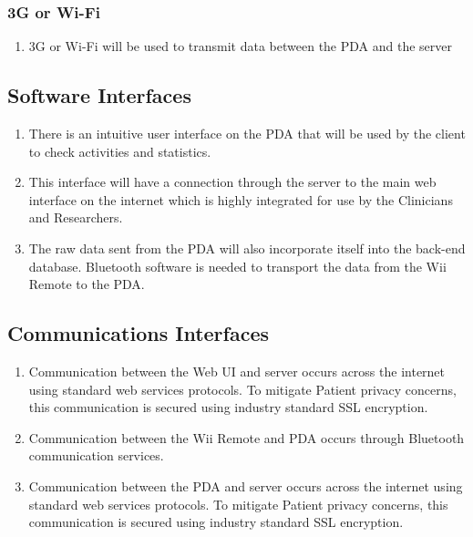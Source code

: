 \documentclass{article}
\begin{document}
\subsubsection{3G or Wi-Fi}
\begin{enumerate}
\item 3G or Wi-Fi will be used to transmit data between the PDA and the server
\end{enumerate}

\subsection{Software Interfaces}

\begin{enumerate}
\item There is an intuitive user interface on the PDA that will be used by the client to check activities and statistics.
\item This interface will have a connection through the server to the main web interface on the internet which is highly integrated for use by the Clinicians and Researchers.
\item The raw data sent from the PDA will also incorporate itself into the back-end database.  Bluetooth software is needed to transport the data from the Wii Remote to the PDA.
\end{enumerate}

\subsection{Communications Interfaces}
\begin{enumerate}

\item Communication between the Web UI and server occurs across the internet using standard web services protocols.  
To mitigate Patient privacy concerns, this communication is secured using industry standard SSL encryption.

\item Communication between the Wii Remote and PDA occurs through Bluetooth communication services.

\item Communication between the PDA and server occurs across the internet using standard web services protocols.
To mitigate Patient privacy concerns, this communication is secured using industry standard SSL encryption.

\end{enumerate}
\end{document}
